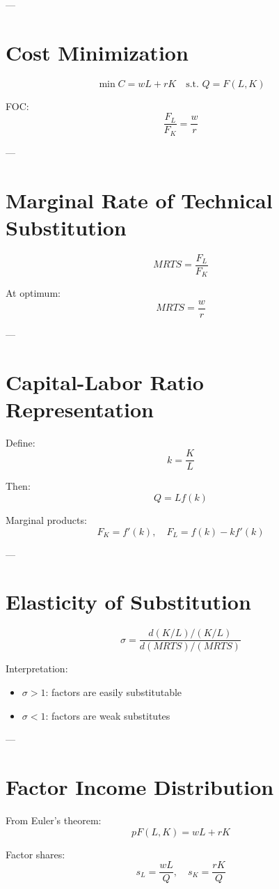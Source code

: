 ---

\section{Cost Minimization}

\[
\min C = wL + rK
\quad \text{s.t. } Q = F(L,K)
\]

FOC:
\[
\frac{F_L}{F_K} = \frac{w}{r}
\]

---

\section{Marginal Rate of Technical Substitution}

\[
MRTS = \frac{F_L}{F_K}
\]

At optimum:
\[
MRTS = \frac{w}{r}
\]

---

\section{Capital-Labor Ratio Representation}

Define:
\[
k = \frac{K}{L}
\]

Then:
\[
Q = L f(k)
\]

Marginal products:
\[
F_K = f'(k), \quad
F_L = f(k) - kf'(k)
\]

---

\section{Elasticity of Substitution}

\[
\sigma = \frac{d(K/L)/(K/L)}{d(MRTS)/(MRTS)}
\]

Interpretation:
\begin{itemize}
    \item $\sigma > 1$: factors are easily substitutable
    \item $\sigma < 1$: factors are weak substitutes
\end{itemize}

---

\section{Factor Income Distribution}

From Euler's theorem:
\[
pF(L,K) = wL + rK
\]

Factor shares:
\[
s_L = \frac{wL}{Q}, \quad s_K = \frac{rK}{Q}
\]

